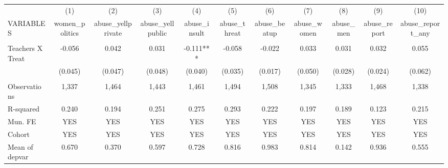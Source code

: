 \begin{tabular}{lcccccccccc} \hline
 & (1) & (2) & (3) & (4) & (5) & (6) & (7) & (8) & (9) & (10) \\
VARIABLES & women\_politics & abuse\_yellprivate & abuse\_yellpublic & abuse\_insult & abuse\_threat & abuse\_beatup & abuse\_women & abuse\_men & abuse\_report & abuse\_report\_any \\ \hline
 &  &  &  &  &  &  &  &  &  &  \\
Teachers X Treat & -0.056 & 0.042 & 0.031 & -0.111*** & -0.058 & -0.022 & 0.033 & 0.031 & 0.032 & 0.055 \\
 & (0.045) & (0.047) & (0.048) & (0.040) & (0.035) & (0.017) & (0.050) & (0.028) & (0.024) & (0.062) \\
 &  &  &  &  &  &  &  &  &  &  \\
Observations & 1,337 & 1,464 & 1,443 & 1,461 & 1,494 & 1,508 & 1,345 & 1,333 & 1,468 & 1,338 \\
R-squared & 0.240 & 0.194 & 0.251 & 0.275 & 0.293 & 0.222 & 0.197 & 0.189 & 0.123 & 0.215 \\
Mun. FE & YES & YES & YES & YES & YES & YES & YES & YES & YES & YES \\
Cohort & YES & YES & YES & YES & YES & YES & YES & YES & YES & YES \\
 Mean of depvar & 0.670 & 0.370 & 0.597 & 0.728 & 0.816 & 0.983 & 0.814 & 0.142 & 0.936 & 0.555 \\ \hline
\end{tabular}
